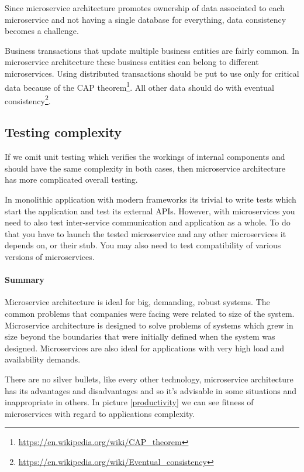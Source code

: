 \documentclass[12pt,oneside]{fithesis2}
\begin{document}
Since microservice architecture promotes ownership of data associated to each microservice and not having a single database for everything, data consistency becomes a challenge.

Business transactions that update multiple business entities are fairly common. In microservice architecture these business entities can belong to different microservices. Using distributed transactions should be put to use only for critical data because of the CAP theorem\footnote{\url{https://en.wikipedia.org/wiki/CAP_theorem}}. All other data should do with eventual consistency\footnote{\url{https://en.wikipedia.org/wiki/Eventual_consistency}}.

\subsection{Testing complexity}

If we omit unit testing which verifies the workings of internal components and should have the same complexity in both cases, then microservice architecture has more complicated overall testing.

In monolithic application with modern frameworks its trivial to write tests which start the application and test its external APIs. However, with microservices you need to also test inter-service communication and application as a whole. To do that you have to launch the tested microservice and any other microservices it depends on, or their stub. You may also need to test compatibility of various versions of microservices.

\paragraph{Summary\newline\newline}

Microservice architecture is ideal for big, demanding, robust systems. The common problems that companies were facing were related to size of the system. Microservice architecture is designed to solve problems of systems which grew in size beyond the boundaries that were initially defined when the system was designed. Microservices are also ideal for applications with very high load and availability demands.

There are no silver bullets, like every other technology, microservice architecture has its advantages and disadvantages and so it's advisable in some situations and inappropriate in others. In picture \ref{productivity} we can see fitness of microservices with regard to applications complexity.
\end{document}
